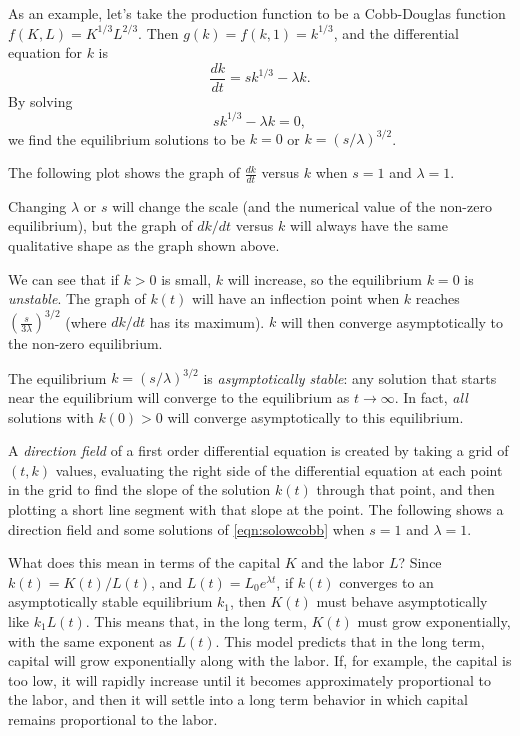 \documentclass{book}
\begin{document}
As an example, let's take the production function to be a
Cobb-Douglas function $f(K,L) = K^{1/3}L^{2/3}$.
Then $g(k) = f(k,1) = k^{1/3}$, and the differential equation for
$k$ is
\begin{equation}
   \frac{dk}{dt} = sk^{1/3} - \lambda k .
\label{eqn:solowcobb}
\end{equation}
By solving
\[
   sk^{1/3} - \lambda k = 0,
\]
we find the equilibrium solutions to be $k=0$ or $k=(s/\lambda)^{3/2}$.

The following plot shows the graph of $\frac{dk}{dt}$ versus $k$ when $s=1$ and
 $\lambda=1$.

\centerline{}

\noindent
Changing $\lambda$ or $s$ will change the scale
(and the numerical value of the non-zero equilibrium),
but the graph of $dk/dt$ versus $k$ will always have the
same qualitative shape as the graph shown above.

We can see that if $k>0$ is small, $k$
will increase, so the equilibrium $k=0$ is \emph{unstable}.
The graph of $k(t)$ will have an inflection point when $k$ reaches
$\left(\frac{s}{3\lambda}\right)^{3/2}$ (where $dk/dt$ has its maximum).
$k$ will then converge asymptotically to the non-zero equilibrium.

The equilibrium $k=(s/\lambda)^{3/2}$ is \emph{asymptotically stable}:
any solution that starts near the equilibrium will converge to the equilibrium
as $t\rightarrow \infty$.
In fact, \emph{all} solutions with $k(0)>0$ will converge asymptotically to this
equilibrium.

A \emph{direction field} of a first order differential equation is created by
taking a grid of $(t,k)$ values, evaluating the right side of the differential
equation at each point in the grid to find the slope of the solution $k(t)$
through that point, and then plotting a short line segment with that slope
at the point.
The following shows a direction field and some solutions
of \eqref{eqn:solowcobb} when $s=1$ and $\lambda=1$.

\centerline{}

\vspace{0.25in}

What does this mean in terms of the capital $K$ and the labor $L$?
Since $k(t) = K(t)/L(t)$, and $L(t) = L_0e^{\lambda t}$, if $k(t)$ converges to an
asymptotically stable equilibrium $k_1$, then $K(t)$ must behave asymptotically like
$k_1  L(t)$.  This means that, in the long term, $K(t)$ must 
grow exponentially, with the
same exponent as $L(t)$.
This model predicts that in the long term, capital will grow
exponentially along with the labor.
If, for example, the capital is too low, it will rapidly increase until it becomes
approximately proportional to the labor, and then it will settle into a long term behavior in
which capital remains proportional to the labor.
\end{document}
